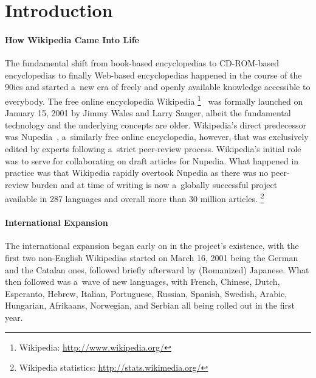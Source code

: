 \documentclass{sig-alternate}
\newcommand{\inlinelistingsize}{\fontsize{8pt}{11pt}}
\let\oldurl\url
\renewcommand{\url}[1]{\inlinelistingsize\oldurl{#1}}
\begin{document}



\section{Introduction}

\paragraph{How Wikipedia Came Into Life}

The fundamental shift from book-based encyclopedias
to CD-ROM-based encyclopedias
to finally Web-based encyclopedias
happened in the course of the 90ies
and started a~new era of freely and openly
available knowledge accessible to everybody.
The free online encyclopedia Wikipedia%
\footnote{Wikipedia: \url{http://www.wikipedia.org/}}~\cite{sanger05historywikipedia} was formally launched
on January 15, 2001 by Jimmy Wales
and Larry Sanger,
albeit the fundamental technology and the underlying concepts are older.
Wikipedia's direct predecessor was Nupedia~\cite{sanger05historywikipedia},
a~similarly free online encyclopedia,
however, that was exclusively edited by experts
following a~strict peer-review process.
Wikipedia's initial role was to serve
for collaborating on draft articles for Nupedia.
What happened in practice was that Wikipedia rapidly overtook Nupedia
as there was no peer-review burden
and at time of writing is now a~globally successful project
available in 287 languages and overall more than 30 million articles.%
\footnote{Wikipedia statistics: \url{http://stats.wikimedia.org/}}

\paragraph{International Expansion}

The international expansion began early on
in the project's existence,
with the first two non-English Wikipedias
started on March 16, 2001 being the German and the Catalan ones,
followed briefly afterward by (Romanized) Japanese.
What then followed was a~wave of new languages,
with French, Chinese, Dutch, Esperanto, Hebrew,
Italian, Portuguese, Russian, Spanish, Swedish,
Arabic, Hungarian, Afrikaans, Norwegian, and Serbian all being rolled out in the first year.
\end{document}
